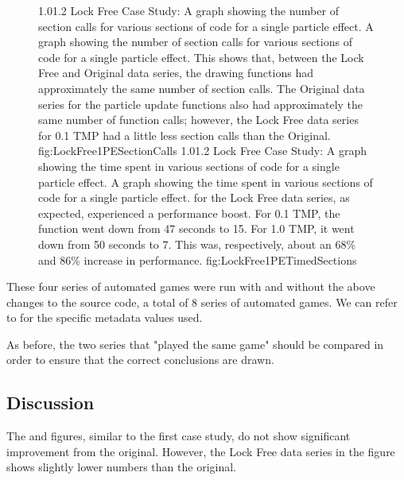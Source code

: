 \begin{figure}
\addtocounter{figure}{-1}
	\vspace{-1.5cm}
	{1.0}{1.2}
	{Lock Free Case Study: A graph showing the number of section calls for various sections of code for a single particle effect.}
	{A graph showing the number of section calls for various sections of code for a single particle effect. This shows that, between the Lock Free and Original data series, the drawing functions had approximately the same number of section calls. The Original data series for the particle update functions also had approximately the same number of function calls; however, the Lock Free data series for 0.1 TMP had a little less section calls than the Original.}
	{fig:LockFree1PESectionCalls}
	\vspace{-1.5cm}
	{1.0}{1.2}
	{Lock Free Case Study: A graph showing the time spent in various sections of code for a single particle effect.}
	{A graph showing the time spent in various sections of code for a single particle effect.  for the Lock Free data series, as expected, experienced a performance boost. For 0.1 TMP, the function went down from 47 seconds to 15. For 1.0 TMP, it went down from 50 seconds to 7. This was, respectively, about an 68\% and 86\% increase in performance.}
	{fig:LockFree1PETimedSections}

\end{figure}

These four series of automated games were run with and without the above changes to the source code, a total of 8 series of automated games. We can refer to  for the specific metadata values used.

As before, the two series that "played the same game" should be compared in order to ensure that the correct conclusions are drawn.

\subsection{Discussion}\label{ssec:studies_lock_free_discussion}

The  and  figures, similar to the first case study, do not show significant improvement from the original. However, the Lock Free data series in the  figure shows slightly lower numbers than the original.


